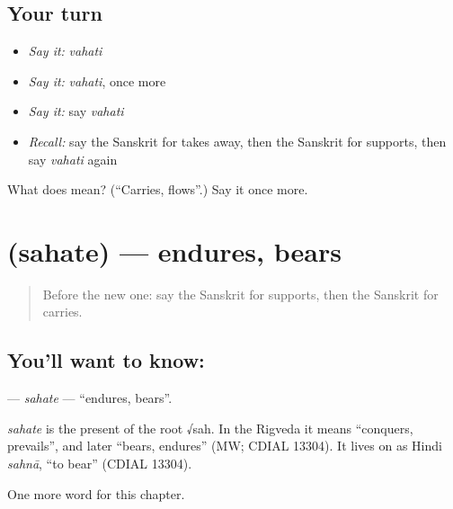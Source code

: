 \subsection*{Your turn}
\begin{itemize}
\raggedright
  \item \emph{Say it:} \emph{vahati}
  \item \emph{Say it:} \emph{vahati}, once more
  \item \emph{Say it:} say \emph{vahati}
  \item \emph{Recall:} say the Sanskrit for takes away, then the Sanskrit for supports, then say \emph{vahati} again
\end{itemize}

\begin{tcolorbox}[breakable,colback=teal!4,colframe=teal!35!black,title={Before you move on}]
What does  mean? (\textquotedblleft{}Carries, flows\textquotedblright{}.) Say it once more.
\end{tcolorbox}
\section[\texorpdfstring{\sk{सहते} (sahate)}{सहते (sahate)}]{ (sahate) — endures, bears}

\label{lesson:SA-C175-sahate}



\begin{quote}
Before the new one: say the Sanskrit for supports, then the Sanskrit for carries.
\end{quote}

\subsection*{You'll want to know: }
\textbf{} — \emph{sahate} — \textquotedblleft{}endures, bears\textquotedblright{}.

\begin{cousinweb}
\emph{sahate} is the present of the root √sah. In the Rigveda it means \textquotedblleft{}conquers, prevails\textquotedblright{}, and later \textquotedblleft{}bears, endures\textquotedblright{} (MW; CDIAL 13304). It lives on as Hindi \emph{sahnā}, \textquotedblleft{}to bear\textquotedblright{} (CDIAL 13304).
\end{cousinweb}

\begin{grammarlens}[title={What you've built}]
One more word for this chapter.
\end{grammarlens}

